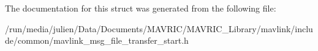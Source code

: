 The documentation for this struct was generated from the following file\+:\begin{DoxyCompactItemize}
\item 
/run/media/julien/\+Data/\+Documents/\+M\+A\+V\+R\+I\+C/\+M\+A\+V\+R\+I\+C\+\_\+\+Library/mavlink/include/common/mavlink\+\_\+msg\+\_\+file\+\_\+transfer\+\_\+start.\+h\end{DoxyCompactItemize}
